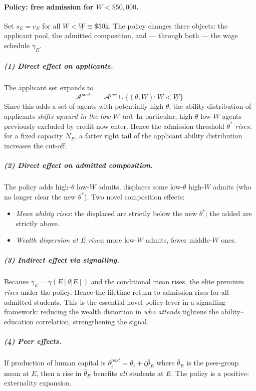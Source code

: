 \documentclass[11pt,a4paper]{article}
\begin{document}
\paragraph{Policy: free admission for $W<\$50{,}000$.}
Set $s_{E}=c_{E}$ for all $W<\underline W\equiv \$50\text{k}$. The policy changes three objects: the applicant pool, the admitted composition, and --- through both --- the wage schedule $\gamma_{E}$.

\subparagraph{(1) Direct effect on applicants.}
The applicant set expands to
\[
\mathcal{A}^{post}\;=\;\mathcal{A}^{pre}\cup\{(\theta,W):W<\underline W\}.
\]
Since this adds a set of agents with potentially high $\theta$, the ability distribution of applicants \emph{shifts upward in the low-$W$ tail}. In particular, high-$\theta$ low-$W$ agents previously excluded by credit now enter. Hence the admission threshold $\theta^{*}$ \emph{rises}: for a fixed capacity $N_{E}$, a fatter right tail of the applicant ability distribution increases the cut-off.

\subparagraph{(2) Direct effect on admitted composition.}
The policy adds high-$\theta$ low-$W$ admits, displaces some low-$\theta$ high-$W$ admits (who no longer clear the new $\theta^{*}$). Two novel composition effects:
\begin{itemize}[leftmargin=*,itemsep=1pt]
    \item \emph{Mean ability rises}: the displaced are strictly below the new $\theta^{*}$; the added are strictly above.
    \item \emph{Wealth dispersion at $E$ rises}: more low-$W$ admits, fewer middle-$W$ ones.
\end{itemize}

\subparagraph{(3) Indirect effect via signalling.}
Because $\gamma_{E}=\gamma(E[\theta|E])$ and the conditional mean rises, the elite premium \emph{rises} under the policy. Hence the lifetime return to admission rises for all admitted students. This is the essential novel policy lever in a signalling framework: reducing the wealth distortion in \emph{who attends} tightens the ability--education correlation, strengthening the signal.

\subparagraph{(4) Peer effects.}
If production of human capital is $\theta_{i}^{post}=\theta_{i}+\zeta\bar\theta_{E}$ where $\bar\theta_{E}$ is the peer-group mean at $E$, then a rise in $\bar\theta_{E}$ benefits \emph{all} students at $E$. The policy is a positive-externality expansion.
\end{document}
